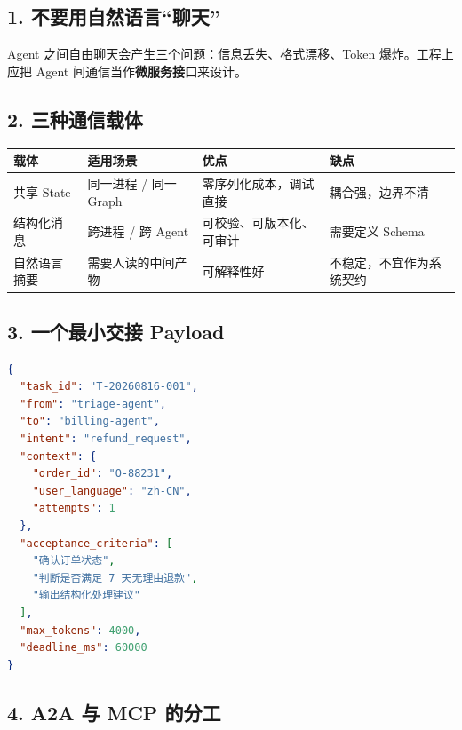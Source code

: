 \documentclass[9pt,a4paper,twocolumn]{ctexart}
\begin{document}
\subsection*{1. 不要用自然语言“聊天”}


Agent 之间自由聊天会产生三个问题：信息丢失、格式漂移、Token 爆炸。工程上应把 Agent 间通信当作\textbf{微服务接口}来设计。



\subsection*{2. 三种通信载体}

{\footnotesize
\begin{tabular}{|p{}|p{}|p{}|p{}|}
\hline
\textbf{载体} & \textbf{适用场景} & \textbf{优点} & \textbf{缺点} \\
\hline
共享 State & 同一进程 / 同一 Graph & 零序列化成本，调试直接 & 耦合强，边界不清 \\
\hline
结构化消息 & 跨进程 / 跨 Agent & 可校验、可版本化、可审计 & 需要定义 Schema \\
\hline
自然语言摘要 & 需要人读的中间产物 & 可解释性好 & 不稳定，不宜作为系统契约 \\
\hline
\end{tabular}
}



\subsection*{3. 一个最小交接 Payload}


\begin{lstlisting}[language=json]
{
  "task_id": "T-20260816-001",
  "from": "triage-agent",
  "to": "billing-agent",
  "intent": "refund_request",
  "context": {
    "order_id": "O-88231",
    "user_language": "zh-CN",
    "attempts": 1
  },
  "acceptance_criteria": [
    "确认订单状态",
    "判断是否满足 7 天无理由退款",
    "输出结构化处理建议"
  ],
  "max_tokens": 4000,
  "deadline_ms": 60000
}
\end{lstlisting}



\subsection*{4. A2A 与 MCP 的分工}
\end{document}
